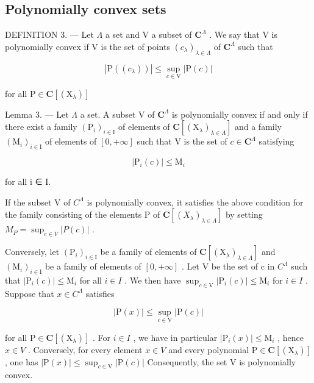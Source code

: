 \subsection{Polynomially convex sets}

DEFINITION 3. --- Let \(\Lambda\) a set and V a subset of \(\mathbf{C}^{\Lambda}\) . We say that V is polynomially convex if V is the set of points \((c_{\lambda})_{\lambda \in \Lambda}\) of \(\mathbf{C}^{\Lambda}\) such that

\[
| \mathrm{P} ((c _ {\lambda})) | \leqslant \sup _ {c \in \mathrm{V}} | \mathrm{P} (c) |
\]

for all \(\mathrm{P}\in \mathbf{C}[(\mathrm{X}_{\lambda})]\)

Lemma 3. --- Let \(\Lambda\) a set. A subset V of \(\mathbf{C}^{\Lambda}\) is polynomially convex if and only if there exist a family \((\mathrm{P}_i)_{i\in \mathrm{I}}\) of elements of \(\mathbf{C}[(\mathrm{X}_{\lambda})_{\lambda \in \Lambda}]\) and a family \((\mathrm{M}_i)_{i\in \mathrm{I}}\) of elements of \([0, +\infty]\) such that V is the set of \(c\in \mathbf{C}^{\Lambda}\) satisfying

\[
| \mathrm{P} _ {i} (c) | \leqslant \mathrm{M} _ {i}
\]

for all i ∈ I.

If the subset V of \(C^{\Lambda}\) is polynomially convex, it satisfies the above condition for the family consisting of the elements P of \(\mathbf{C}[(X_{\lambda})_{\lambda\in\Lambda}]\) by setting \(M_{P}=\sup_{c\in V}|P(c)|\) .

Conversely, let \((\mathrm{P}_{i})_{i\in\mathrm{I}}\) be a family of elements of \(\mathbf{C}[(\mathrm{X}_{\lambda})_{\lambda\in\Lambda}]\) and \((\mathrm{M}_{i})_{i\in\mathrm{I}}\) be a family of elements of \([0,+\infty]\) . Let V be the set of c in \(C^{\Lambda}\) such that \(|\mathrm{P}_{i}(c)|\leqslant\mathrm{M}_{i}\) for all \(i\in I\) . We then have \(\sup_{c\in\mathrm{V}}|\mathrm{P}_{i}(c)|\leqslant\mathrm{M}_{i}\) for \(i\in I\) . Suppose that \(x\in C^{\Lambda}\) satisfies

\[
| \mathrm{P} (x) | \leqslant \sup _ {c \in \mathrm{V}} | \mathrm{P} (c) |
\]

for all \(\mathrm{P}\in\mathbf{C}[(\mathrm{X}_{\lambda})]\) . For \(i\in I\) , we have in particular \(|\mathrm{P}_{i}(x)|\leqslant\mathrm{M}_{i}\) , hence \(x\in V\) . Conversely, for every element \(x\in V\) and every polynomial \(\mathrm{P}\in\mathbf{C}[(\mathrm{X}_{\lambda})]\) , one has \(|\mathrm{P}(x)|\leqslant\sup_{c\in\mathrm{V}}|\mathrm{P}(c)|\) Consequently, the set V is polynomially convex.

